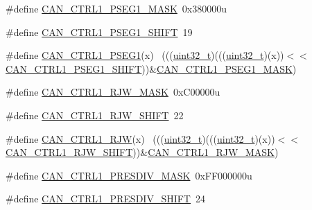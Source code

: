 \begin{DoxyCompactItemize}
\item 
\#define \hyperlink{group___c_a_n___register___masks_gac32963f42638264064b58687c249c994}{C\+A\+N\+\_\+\+C\+T\+R\+L1\+\_\+\+P\+S\+E\+G1\+\_\+\+M\+A\+SK}~0x380000u
\item 
\#define \hyperlink{group___c_a_n___register___masks_gab92532aaca53b7fae9c2d9d7186e3a91}{C\+A\+N\+\_\+\+C\+T\+R\+L1\+\_\+\+P\+S\+E\+G1\+\_\+\+S\+H\+I\+FT}~19
\item 
\#define \hyperlink{group___c_a_n___register___masks_ga1982e1c68b1837d71d6c39be8e5f21b4}{C\+A\+N\+\_\+\+C\+T\+R\+L1\+\_\+\+P\+S\+E\+G1}(x)                                          ~(((\hyperlink{_p_e___types_8h_a33594304e786b158f3fb30289278f5af}{uint32\+\_\+t})(((\hyperlink{_p_e___types_8h_a33594304e786b158f3fb30289278f5af}{uint32\+\_\+t})(x))$<$$<$\hyperlink{group___c_a_n___register___masks_gab92532aaca53b7fae9c2d9d7186e3a91}{C\+A\+N\+\_\+\+C\+T\+R\+L1\+\_\+\+P\+S\+E\+G1\+\_\+\+S\+H\+I\+FT}))\&\hyperlink{group___c_a_n___register___masks_gac32963f42638264064b58687c249c994}{C\+A\+N\+\_\+\+C\+T\+R\+L1\+\_\+\+P\+S\+E\+G1\+\_\+\+M\+A\+SK})
\item 
\#define \hyperlink{group___c_a_n___register___masks_ga10512d44b72e4fcf8fff8052dba9fd3a}{C\+A\+N\+\_\+\+C\+T\+R\+L1\+\_\+\+R\+J\+W\+\_\+\+M\+A\+SK}~0x\+C00000u
\item 
\#define \hyperlink{group___c_a_n___register___masks_ga6fbcc0f866380f763269138136a2a92e}{C\+A\+N\+\_\+\+C\+T\+R\+L1\+\_\+\+R\+J\+W\+\_\+\+S\+H\+I\+FT}~22
\item 
\#define \hyperlink{group___c_a_n___register___masks_ga3bb08577b4b9ee2cfba3a2f21f840942}{C\+A\+N\+\_\+\+C\+T\+R\+L1\+\_\+\+R\+JW}(x)                                              ~(((\hyperlink{_p_e___types_8h_a33594304e786b158f3fb30289278f5af}{uint32\+\_\+t})(((\hyperlink{_p_e___types_8h_a33594304e786b158f3fb30289278f5af}{uint32\+\_\+t})(x))$<$$<$\hyperlink{group___c_a_n___register___masks_ga6fbcc0f866380f763269138136a2a92e}{C\+A\+N\+\_\+\+C\+T\+R\+L1\+\_\+\+R\+J\+W\+\_\+\+S\+H\+I\+FT}))\&\hyperlink{group___c_a_n___register___masks_ga10512d44b72e4fcf8fff8052dba9fd3a}{C\+A\+N\+\_\+\+C\+T\+R\+L1\+\_\+\+R\+J\+W\+\_\+\+M\+A\+SK})
\item 
\#define \hyperlink{group___c_a_n___register___masks_gad8d384c87d48a3fc0b1ae52949823818}{C\+A\+N\+\_\+\+C\+T\+R\+L1\+\_\+\+P\+R\+E\+S\+D\+I\+V\+\_\+\+M\+A\+SK}~0x\+F\+F000000u
\item 
\#define \hyperlink{group___c_a_n___register___masks_ga762ed1bd89d4db4a6f34a12f8ae0afcf}{C\+A\+N\+\_\+\+C\+T\+R\+L1\+\_\+\+P\+R\+E\+S\+D\+I\+V\+\_\+\+S\+H\+I\+FT}~24

\end{DoxyCompactItemize}
